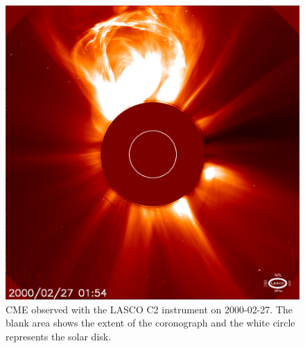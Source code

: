 \begin{figure}
    \centering
    \includegraphics[width=0.5\columnwidth]{Images/LASCO_C2_CME.jpg}
    \caption{CME observed with the LASCO C2 instrument on 2000-02-27. The blank area shows the extent of the coronograph and the white circle represents the solar disk.}
    \label{fig:CME}
\end{figure}




